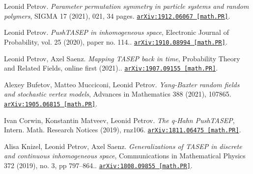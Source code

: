 \documentclass[letterpaper,11pt]{article}
\begin{document}
\begin{etaremune}
	
	
	\item 
	Leonid Petrov.
	\emph{Parameter permutation symmetry in particle systems and random polymers}, SIGMA 17 (2021), 021, 34 pages. 
	\href{https://arxiv.org/abs/1912.06067}{\texttt{arXiv:1912.06067 [math.PR]}}.
	
	
	
	\item 
	Leonid Petrov.
	\emph{PushTASEP in inhomogeneous space}, Electronic Journal of Probability, vol. 25 (2020), paper no. 114.. 
	\href{https://arxiv.org/abs/1910.08994}{\texttt{arXiv:1910.08994 [math.PR]}}.
	
	
	
	
	
	
	
	
	
	\item 
	Leonid Petrov, Axel Saenz.
	\emph{Mapping TASEP back in time}, Probability Theory and Related Fields, online first (2021).. 
	\href{https://arxiv.org/abs/1907.09155}{\texttt{arXiv:1907.09155 [math.PR]}}.
	
	
	
	
	
	
	
	\item 
	Alexey Bufetov, Matteo Mucciconi, Leonid Petrov.
	\emph{Yang-Baxter random fields and stochastic vertex models}, Advances in Mathematics 388 (2021), 107865. 
	\href{https://arxiv.org/abs/1905.06815}{\texttt{arXiv:1905.06815 [math.PR]}}.
	
	
	
	
	
	
	
	
	
	
	
	
	
	
	
	\item 
	Ivan Corwin, Konstantin Matveev, Leonid Petrov.
	\emph{The q-Hahn PushTASEP}, Intern. Math. Research Notices (2019),  rnz106. 
	\href{https://arxiv.org/abs/1811.06475}{\texttt{arXiv:1811.06475 [math.PR]}}.
	
	
	
	
	
	\item 
	Alisa Knizel, Leonid Petrov, Axel Saenz.
	\emph{Generalizations of TASEP in discrete and continuous inhomogeneous space}, Communications in Mathematical Physics 372 (2019), no. 3, pp 797–864.. 
	\href{https://arxiv.org/abs/1808.09855}{\texttt{arXiv:1808.09855 [math.PR]}}.
	

\end{etaremune}
\end{document}
